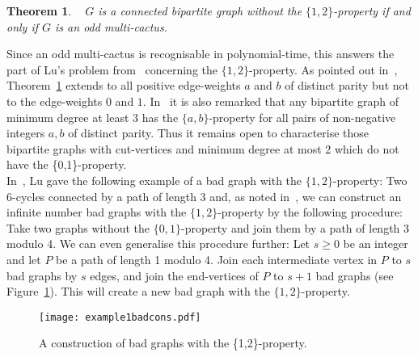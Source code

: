 \documentclass[
final,
 nomarks,
]{dmtcs-episciences}
\newtheorem{theorem}{Theorem}[]
\theoremstyle{definition}
\begin{document}
\begin{theorem} \label{thm:12oddmul} \emph{~\cite{TWZ}}
$G$ is a connected bipartite graph without the $\{1,2\}$-property if and only if $G$ is an odd multi-cactus.
\end{theorem}
\noindent Since an odd multi-cactus is recognisable in polynomial-time, this answers the part of Lu's problem from~\cite{Lu} concerning the $\{1,2\}$-property. As pointed out in~\cite{TWZ}, Theorem~\ref{thm:12oddmul} extends to all positive edge-weights $a$ and $b$ of distinct parity but not to the edge-weights $0$ and $1$. In~\cite{TWZ} it is also remarked that any bipartite graph of minimum degree at least 3 has the $\{a,b\}$-property for all pairs of non-negative integers $a,b$ of distinct parity. Thus it remains open to characterise those bipartite graphs with cut-vertices and minimum degree at most 2 which do not have the \{0,1\}-property. \\  
In~\cite{Lu}, Lu gave the following example of a bad graph with the $\{1,2\}$-property: Two 6-cycles connected by a path of length 3 and, as noted in~\cite{TWZ}, we can construct an infinite number bad graphs with the $\{1,2\}$-property by the following procedure: Take two graphs without the $\{0,1\}$-property and join them by a path of length 3 modulo 4. We can even generalise this procedure further: Let $s \geq 0$ be an integer and let $P$ be a path of length 1 modulo 4. Join each intermediate vertex in $P$ to $s$ bad graphs by $s$ edges, and join the end-vertices of $P$ to $s+1$ bad graphs (see Figure~\ref{fig:badex1}). This will create a new bad graph with the $\{1,2\}$-property. 
\begin{figure}[H]
\centering
\texttt{[image: example1badcons.pdf]} 
\caption{A construction of bad graphs with the \{1,2\}-property.}
\label{fig:badex1}
\end{figure}
\end{document}
